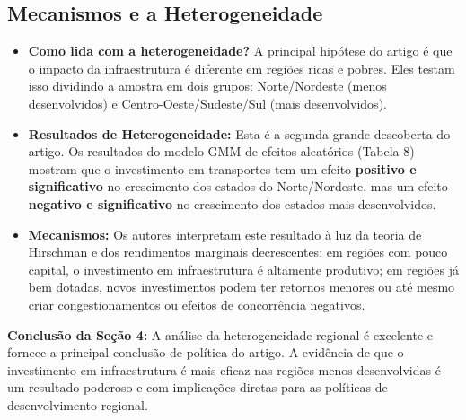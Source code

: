 \documentclass[12pt, a4paper]{article}
\begin{document}
\subsection{Mecanismos e a Heterogeneidade}

\begin{itemize}
    \item \textbf{Como lida com a heterogeneidade?} A principal hipótese do artigo é que o impacto da infraestrutura é diferente em regiões ricas e pobres. Eles testam isso dividindo a amostra em dois grupos: Norte/Nordeste (menos desenvolvidos) e Centro-Oeste/Sudeste/Sul (mais desenvolvidos).
    \item \textbf{Resultados de Heterogeneidade:} Esta é a segunda grande descoberta do artigo. Os resultados do modelo GMM de efeitos aleatórios (Tabela 8) mostram que o investimento em transportes tem um efeito \textbf{positivo e significativo} no crescimento dos estados do Norte/Nordeste, mas um efeito \textbf{negativo e significativo} no crescimento dos estados mais desenvolvidos.
    \item \textbf{Mecanismos:} Os autores interpretam este resultado à luz da teoria de Hirschman e dos rendimentos marginais decrescentes: em regiões com pouco capital, o investimento em infraestrutura é altamente produtivo; em regiões já bem dotadas, novos investimentos podem ter retornos menores ou até mesmo criar congestionamentos ou efeitos de concorrência negativos.
\end{itemize}

\noindent\textbf{Conclusão da Seção 4:} A análise da heterogeneidade regional é excelente e fornece a principal conclusão de política do artigo. A evidência de que o investimento em infraestrutura é mais eficaz nas regiões menos desenvolvidas é um resultado poderoso e com implicações diretas para as políticas de desenvolvimento regional.
\end{document}
